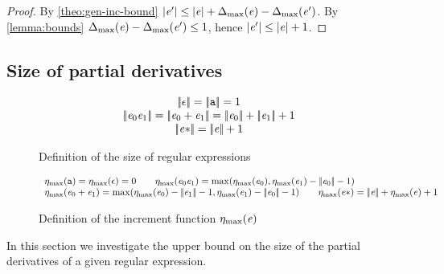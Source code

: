 
\begin{proof}
 By \cref{theo:gen-inc-bound} ${\mid}{\mathit {e}'}{\mid}\leq{\mid}{\ensuremath{\mathit {e}}}{\mid}+{\Delta_{\max}}({\mathit {e}})-{\Delta_{\max}}({\mathit {e}'})$. By \cref{lemma:bounds}
 ${\Delta_{\max}}({\mathit {e}})-{\Delta_{\max}}({\mathit {e}'})\leq 1$, hence
 ${\mid}{\mathit {e}'}{\mid}\leq{\mid}{\ensuremath{\mathit {e}}}{\mid}+1$.
\end{proof}

\subsection{Size of partial derivatives}\label{sec:size}
\begin{figure}
 $$
  \begin{array}{c}
   \tsize{\eps}=\tsize{\sym}=1                                                    \\
   \tsize{\re_0\catop\re_1}=\tsize{\re_0\orop\re_1}=\tsize{\re_0}+\tsize{\re_1}+1 \\
   \tsize{\starop{\re}}=\tsize{\re}+1
  \end{array}
 $$
 \caption{Definition of the size of regular expressions}
 \label{fig:size}
\end{figure}

\begin{figure}
 $$
  \begin{array}{l}
   \incFunSize{\sym}=\incFunSize{\eps}=0                                      \qquad
   \incFunSize{\re_0\catop\re_1}=\max(\incFunSize{\re_0},\incFunSize{\re_1}-\tsize{\re_0}-1) \\
   \incFunSize{\re_0\orop\re_1}= \max(\incFunSize{\re_0}-\tsize{\re_1}-1,\incFunSize{\re_1}-\tsize{\re_0}-1)                                        \qquad
   \incFunSize{\starop{\re}}=\tsize{\re}+\incFunSize{\re}+1
  \end{array}
 $$
 \caption{Definition of the increment function ${\eta_{\max}}({\mathit {e}})$}
 \label{fig:incFunSize}
\end{figure}

In this section we investigate the upper bound on the size of the partial derivatives of a given regular expression.

